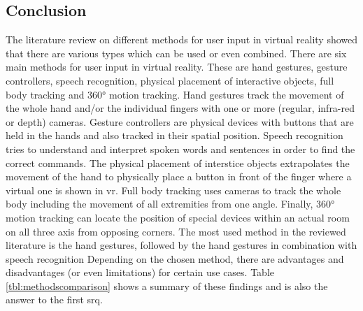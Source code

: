 
\subsection{Conclusion}

The literature review on different methods for user input in virtual reality showed that there are various types which can be used or even combined. \newline
There are six main methods for user input in virtual reality. These are hand gestures, gesture controllers, speech recognition, physical placement of interactive objects, full body tracking and 360° motion tracking. Hand gestures track the movement of the whole hand and/or the individual fingers with one or more (regular, infra-red or depth) cameras. Gesture controllers are physical devices with buttons that are held in the hands and also tracked in their spatial position. Speech recognition tries to understand and interpret spoken words and sentences in order to find the correct commands. The physical placement of interstice objects extrapolates the movement of the hand to physically place a button in front of the finger where a virtual one is shown in \gls{vr}. Full body tracking uses cameras to track the whole body including the movement of all extremities from one angle. Finally, 360° motion tracking can locate the position of special devices within an actual room on all three axis from opposing corners. The most used method in the reviewed literature is the hand gestures, followed by the hand gestures in combination with speech recognition \newline
Depending on the chosen method, there are advantages and disadvantages (or even limitations) for certain use cases. Table \ref{tbl:methodscomparison} shows a summary of these findings and is also the answer to the first \gls{srq}.

